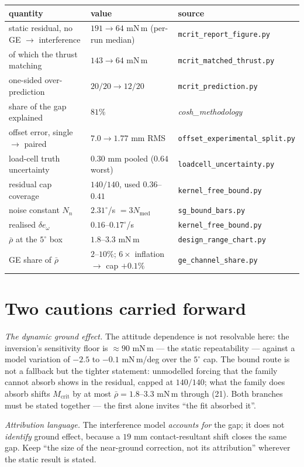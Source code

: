 \documentclass[10pt]{article}
\newcommand{\scr}[1]{\texttt{\small #1}}
\begin{document}
\begin{center}\small
\begin{tabular}{@{}lll@{}}
\toprule
quantity & value & source\\
\midrule
static residual, no GE $\to$ interference &
  $191 \to 64$ mN\,m (per-run median) & \scr{mcrit\_report\_figure.py}\\
\quad of which the thrust matching &
  $143 \to 64$ mN\,m & \scr{mcrit\_matched\_thrust.py}\\
one-sided over-prediction &
  $20/20 \to 12/20$ & \scr{mcrit\_prediction.py}\\
share of the gap explained & $81\%$ &
  \emph{cosh\_methodology}\\
\addlinespace
offset error, single $\to$ paired &
  $7.0 \to 1.77$ mm RMS & \scr{offset\_experimental\_split.py}\\
load-cell truth uncertainty &
  $0.30$ mm pooled ($0.64$ worst) & \scr{loadcell\_uncertainty.py}\\
\addlinespace
residual cap coverage & $140/140$, used $0.36$--$0.41$ &
  \scr{kernel\_free\_bound.py}\\
noise constant $N_n$ & $2.31^\circ$/s $= 3N_{\mathrm{med}}$ &
  \scr{sg\_bound\_bars.py}\\
realised $\delta e_\omega$ & $0.16$--$0.17^\circ$/s &
  \scr{kernel\_free\_bound.py}\\
$\bar\rho$ at the $5^\circ$ box & $1.8$--$3.3$ mN\,m &
  \scr{design\_range\_chart.py}\\
GE share of $\bar\rho$ & $2$--$10\%$; $6\times$ inflation $\to$
  cap $+0.1\%$ & \scr{ge\_channel\_share.py}\\
\bottomrule
\end{tabular}
\end{center}

\section{Two cautions carried forward}

\emph{The dynamic ground effect.} The attitude dependence is not
resolvable here: the inversion's sensitivity floor is
$\approx 90$ mN\,m --- the static repeatability --- against a model
variation of $-2.5$ to $-0.1$ mN\,m/deg over the $5^\circ$ cap. The
bound route is not a fallback but the tighter statement: unmodelled
forcing that the family cannot absorb shows in the residual, capped at
$140/140$; what the family does absorb shifts $M_{\mathrm{crit}}$ by at
most $\bar\rho = 1.8$--$3.3$ mN\,m through (21). Both branches must be
stated together --- the first alone invites ``the fit absorbed it''.

\emph{Attribution language.} The interference model \emph{accounts
for} the gap; it does not \emph{identify} ground effect, because a
$19$ mm contact-resultant shift closes the same gap. Keep
``the size of the near-ground correction, not its attribution''
wherever the static result is stated.
\end{document}
